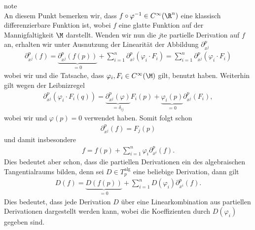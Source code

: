 \documentclass[letterpaper,10pt,english]{jupyterBook}
\begin{document}
\begin{sphinxadmonition}{note}
\begin{equation*}
\end{equation*}
\sphinxAtStartPar
An diesem Punkt bemerken wir, dass \(f\circ \varphi^{-1} \in C^\infty(\R^n)\) eine klassisch differenzierbare Funktion ist, wobei \(f\) eine glatte Funktion auf der Mannigfaltigkeit \(\M\) darstellt.
Wenden wir nun die \(j\)\sphinxhyphen{}te partielle Derivation auf \(f\) an, erhalten wir unter Ausnutzung der Linearität der Abbildung \(\partial_{x^j}^p\)
\begin{equation*}
\begin{split}\partial_{x^j}^p (f) = 
\underbrace{\partial_{x^j}^p (f(p))}_{=0} + 
\sum_{i=1}^{n} \partial_{x^j}^p(\varphi_i \cdot F_i) = 
\sum_{i=1}^{n} \partial_{x^j}^p(\varphi_i \cdot F_i)\end{split}
\end{equation*}
\sphinxAtStartPar
wobei wir {\hyperref[\detokenize{manifolds/tangential:lem:constder}]{}} und die Tatsache, dass \(\varphi_i, F_i\in C^\infty(\M)\) gilt, benutzt haben.
Weiterhin gilt wegen der Leibnizregel
\begin{equation*}
\begin{split}\partial_{x^j}^p(\varphi_i \cdot F_i(q)) = 
\underbrace{\partial_{x^j}^p(\varphi)}_{=\delta_{ij}} F_i(p)+ \underbrace{\varphi_i(p)}_{=0} \partial_{x^j}^p(F_i),\end{split}
\end{equation*}
\sphinxAtStartPar
wobei wir {\hyperref[\detokenize{manifolds/tangential:lem:partderkron}]{}} und \(\varphi(p)=0\) verwendet haben.
Somit folgt schon
\begin{equation*}
\begin{split}\partial_{x^j}^p (f) = F_j(p)\end{split}
\end{equation*}
\sphinxAtStartPar
und damit insbesondere
\begin{equation*}
\begin{split}f = f(p) + \sum_{i=1}^{n} \varphi_i \partial_{x^i}^p(f).\end{split}
\end{equation*}
\sphinxAtStartPar
Dies bedeutet aber schon, dass die partiellen Derivationen ein  des algebraischen Tangentialraums bilden, denn sei \(D\in T^{\text{alg}}_p\) eine beliebige Derivation, dann gilt
\begin{equation*}
\begin{split}D(f) = \underbrace{D(f(p))}_{=0} + \sum_{i=1}^n D(\varphi_i) \partial_{x^i}^p(f).\end{split}
\end{equation*}
\sphinxAtStartPar
Dies bedeutet, dass jede Derivation \(D\) über eine Linearkombination aus partiellen Derivationen dargestellt werden kann, wobei die Koeffizienten durch \(D(\varphi_i)\) gegeben sind.


\end{sphinxadmonition}
\end{document}
